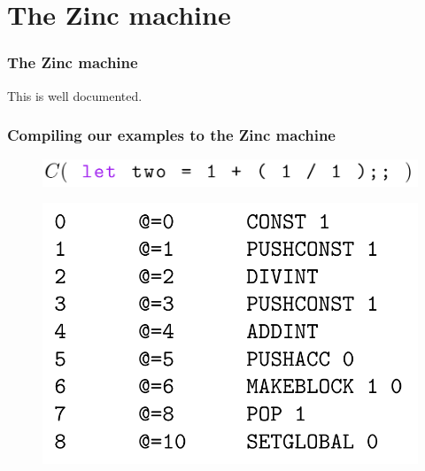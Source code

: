 \documentclass{beamer}
\begin{document}
  \section{The Zinc machine}
  \begin{frame}
    \frametitle{The Zinc machine}
    This is well documented.
    
  \end{frame}
  \begin{frame}
    \frametitle{Compiling our examples to the Zinc machine}
    \begin{figure}[ht]
      \begin{center}        
        \includegraphics[width=\textwidth,height=0.075\textheight,keepaspectratio]{pipelinefigures/CompilerPathwayArithmeticExampleCompilationInvocation.pdf}
      \end{center}      
    \end{figure}        
    \begin{figure}[ht]
      \begin{center}        
        \includegraphics[width=\textwidth,height=0.6\textheight,keepaspectratio]{pipelinefigures/CompilationPathwayArithmeticExampleBytecode.pdf}
      \end{center}      
    \end{figure}        
  \end{frame}
\end{document}
